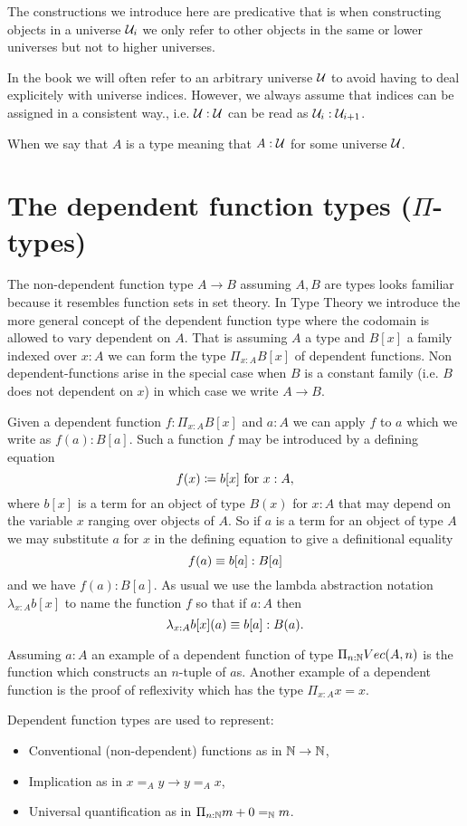The constructions we introduce here are predicative that is when
constructing objects in a universe ${\mathcal U}_i$ we only refer to other
objects in the same or lower universes but not to higher universes.

In the book we will often refer to an arbitrary universe ${\mathcal U}$ to
avoid having to deal explicitely with universe indices. However, we
always assume that indices can be assigned in a consistent way.,
i.e. ${\mathcal U} : {\mathcal U}$ can be read as ${\mathcal U}_i : {\mathcal U}_{i+1}$.

When we say that $A$ is a type meaning that $A : {\mathcal U}$ for some universe
${\mathcal U}$. 

\section{The dependent function types ($\Pi$-types)}

The non-dependent function type $A \to B$ assuming $A,B$ are types
looks familiar because it resembles function sets in set theory.  In
Type Theory we introduce the more general concept of the dependent
function type where the codomain is allowed to vary dependent on
$A$. That is assuming $A$ a type and $B[x]$ a family indexed over
$x:A$ we can form the type $\Pi_{x:A}B[x]$ of dependent functions. Non
dependent-functions arise in the special case when $B$ is a constant
family (i.e. $B$ does not dependent on $x$) in which case we write $A
\to B$.

Given a dependent function $f : \Pi_{x:A}B[x]$ and $a : A$ we can
apply $f$ to $a$ which we write as $f(a) : B[a]$.  Such a function $f$ may be introduced by a defining equation
  \[ f(x)\coloneqq b[x]\mbox{ for } x:A,\]
where $b[x]$ is a term for an object of type $B(x)$ for $x:A$ that may depend on the variable $x$ ranging over objects of $A$.  So if $a$ is a term for an object of type $A$ we may substitute $a$ for $x$ in the defining equation to give a definitional equality
  \[ f(a)\equiv b[a]:B[a]\]
and we have $f(a):B[a]$.  As usual we use the lambda abstraction notation 
$\lambda_{x:A}b[x]$ to name the function $f$ so that if $a:A$ then
  \[\lambda_{x:A}b[x](a)\equiv b[a]: B(a).\]

Assuming $a:A$ an example of a dependent function of type $\Pi_{n:\mathbb{N}}Vec(A,n)$
is the function which constructs an $n$-tuple of $a$s. Another example
of a dependent function is the proof of reflexivity which has the type
$\Pi_{x:A}x = x$.

Dependent function types are used to represent:
\begin{itemize}
\item Conventional (non-dependent) functions as in $\mathbb{N} \to \mathbb{N}$,
\item Implication as in $x =_A y \to y =_A x$,
\item Universal quantification as in $\Pi_{n:\mathbb{N}}m+0 =_\mathbb{N} m$.
\end{itemize}

